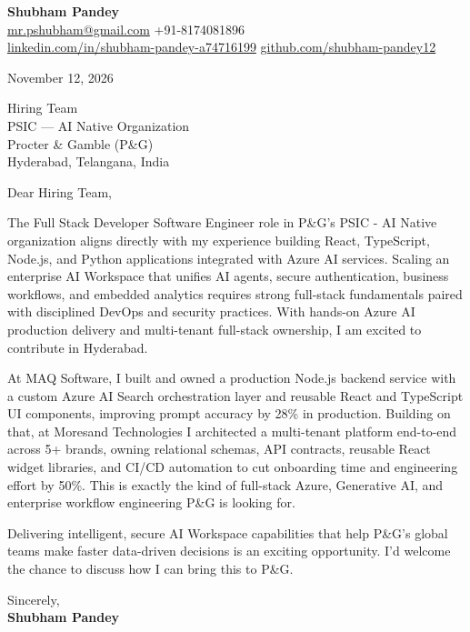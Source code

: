 \documentclass[a4paper,11pt]{article}
\begin{document}
\textbf{\Large Shubham Pandey}\\
\href{mailto:mr.pshubham@gmail.com}{mr.pshubham@gmail.com} \quad +91-8174081896\\
\href{https://www.linkedin.com/in/shubham-pandey-a74716199/}{linkedin.com/in/shubham-pandey-a74716199} \quad
\href{https://github.com/shubham-pandey12}{github.com/shubham-pandey12}

\vspace{1em}
November 12, 2026

\vspace{1em}
Hiring Team\\
PSIC --- AI Native Organization\\
Procter \& Gamble (P\&G)\\
Hyderabad, Telangana, India

\vspace{1em}
Dear Hiring Team,

The Full Stack Developer Software Engineer role in P\&G's PSIC - AI Native organization aligns directly with my experience building React, TypeScript, Node.js, and Python applications integrated with Azure AI services. Scaling an enterprise AI Workspace that unifies AI agents, secure authentication, business workflows, and embedded analytics requires strong full-stack fundamentals paired with disciplined DevOps and security practices. With hands-on Azure AI production delivery and multi-tenant full-stack ownership, I am excited to contribute in Hyderabad.

At MAQ Software, I built and owned a production Node.js backend service with a custom Azure AI Search orchestration layer and reusable React and TypeScript UI components, improving prompt accuracy by 28\% in production. Building on that, at Moresand Technologies I architected a multi-tenant platform end-to-end across 5+ brands, owning relational schemas, API contracts, reusable React widget libraries, and CI/CD automation to cut onboarding time and engineering effort by 50\%. This is exactly the kind of full-stack Azure, Generative AI, and enterprise workflow engineering P\&G is looking for.

Delivering intelligent, secure AI Workspace capabilities that help P\&G's global teams make faster data-driven decisions is an exciting opportunity. I'd welcome the chance to discuss how I can bring this to P\&G.

\vspace{1em}
Sincerely,\\[0.5em]
\textbf{Shubham Pandey}
\end{document}

